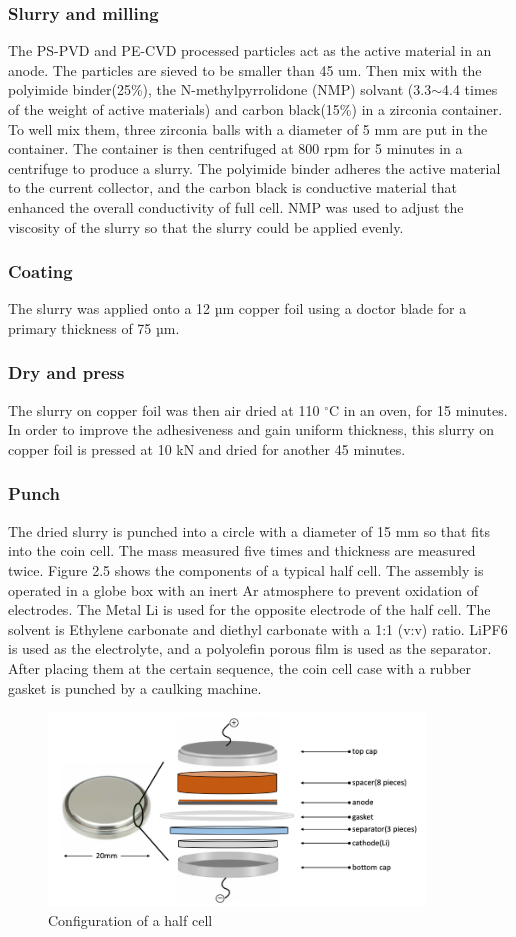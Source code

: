 \subsubsection{Slurry and milling}
The PS-PVD and PE-CVD processed particles act as the active material in an anode. The particles are sieved to be smaller than 45 um. Then mix with the polyimide binder(25\%), the N-methylpyrrolidone (NMP) solvant (3.3$\sim$4.4 times of the weight of active materials) and carbon black(15\%) in a zirconia container. To well mix them, three zirconia balls with a diameter of 5 mm are put in the container. The container is then centrifuged at 800 rpm for 5 minutes in a centrifuge to produce a slurry. The polyimide binder adheres the active material to the current collector, and the carbon black is conductive material that enhanced the overall conductivity of full cell. NMP was used to adjust the viscosity of the slurry so that the slurry could be applied evenly.
\subsubsection{Coating}
The slurry was applied onto a 12 µm copper foil using a doctor blade for a primary thickness of 75 µm.
\subsubsection{Dry and press}
The slurry on copper foil was then air dried at 110 \(^\circ\)C in an oven, for 15 minutes. In order to improve the adhesiveness and gain uniform thickness, this slurry on copper foil is pressed at 10 kN and dried for another 45 minutes.
\subsubsection{Punch}
The dried slurry is punched into a circle with a diameter of 15 mm so that fits into the coin cell. The mass measured five times and thickness are measured twice.
Figure 2.5 shows the components of a typical half cell. The assembly is operated in a globe box with an inert Ar atmosphere to prevent oxidation of electrodes. The Metal Li is used for the opposite electrode of the half cell. The solvent is Ethylene carbonate and diethyl carbonate with a 1:1 (v:v) ratio. LiPF6 is used as the electrolyte, and a polyolefin porous film is used as the separator. After placing them at the certain sequence, the coin cell case with a rubber gasket is punched by a caulking machine.
\begin{figure}[H]
\centering
\includegraphics[width=10cm]{src/fig/fig24.png}
\caption{Configuration of  a half cell}
\end{figure}
